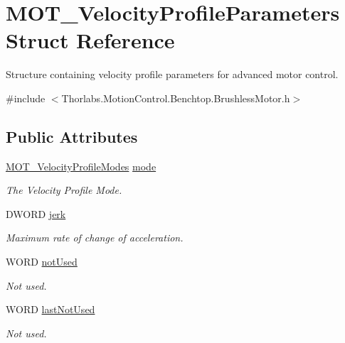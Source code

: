 \hypertarget{struct_m_o_t___velocity_profile_parameters}{}\section{M\+O\+T\+\_\+\+Velocity\+Profile\+Parameters Struct Reference}
\label{struct_m_o_t___velocity_profile_parameters}


Structure containing velocity profile parameters for advanced motor control.  




{\ttfamily \#include $<$Thorlabs.\+Motion\+Control.\+Benchtop.\+Brushless\+Motor.\+h$>$}

\subsection*{Public Attributes}
\begin{DoxyCompactItemize}
\item 
\hyperlink{group___common_gaa69399e5492d572d7976b386dbcb3ffe}{M\+O\+T\+\_\+\+Velocity\+Profile\+Modes} \hyperlink{struct_m_o_t___velocity_profile_parameters_a7afca60ad76895b0f67e17b97ad8bcb0}{mode}
\begin{DoxyCompactList}\small\item\em The Velocity Profile Mode. \end{DoxyCompactList}\item 
D\+W\+O\+RD \hyperlink{struct_m_o_t___velocity_profile_parameters_a302ba9cec95692cd2ea22331b259a69e}{jerk}
\begin{DoxyCompactList}\small\item\em Maximum rate of change of acceleration. \end{DoxyCompactList}\item 
W\+O\+RD \hyperlink{struct_m_o_t___velocity_profile_parameters_af186bfbfc25f5554b4c20a2fd8a0667c}{not\+Used}
\begin{DoxyCompactList}\small\item\em Not used. \end{DoxyCompactList}\item 
W\+O\+RD \hyperlink{struct_m_o_t___velocity_profile_parameters_abe553e3d79b79259039b34ac2e5e7e75}{last\+Not\+Used}
\begin{DoxyCompactList}\small\item\em Not used. \end{DoxyCompactList}\end{DoxyCompactItemize}


